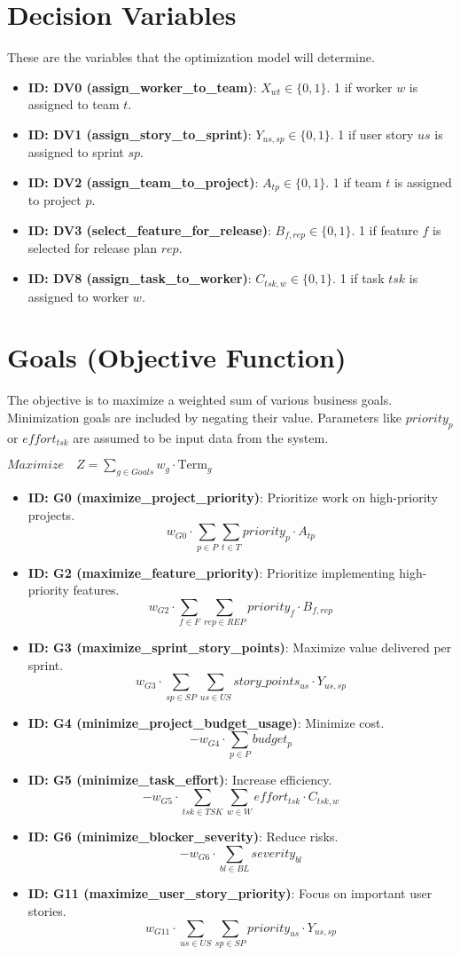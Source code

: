 \documentclass{article}
\begin{document}
\section{Decision Variables}
These are the variables that the optimization model will determine.
\begin{itemize}
    \item \textbf{ID: DV0 (assign\_worker\_to\_team)}: $X_{wt} \in \{0, 1\}$. 1 if worker $w$ is assigned to team $t$.
    \item \textbf{ID: DV1 (assign\_story\_to\_sprint)}: $Y_{us,sp} \in \{0, 1\}$. 1 if user story $us$ is assigned to sprint $sp$.
    \item \textbf{ID: DV2 (assign\_team\_to\_project)}: $A_{tp} \in \{0, 1\}$. 1 if team $t$ is assigned to project $p$.
    \item \textbf{ID: DV3 (select\_feature\_for\_release)}: $B_{f,rep} \in \{0, 1\}$. 1 if feature $f$ is selected for release plan $rep$.
    \item \textbf{ID: DV8 (assign\_task\_to\_worker)}: $C_{tsk,w} \in \{0, 1\}$. 1 if task $tsk$ is assigned to worker $w$.
\end{itemize}

\section{Goals (Objective Function)}
The objective is to maximize a weighted sum of various business goals. Minimization goals are included by negating their value. Parameters like $priority_p$ or $effort_{tsk}$ are assumed to be input data from the system.

$Maximize \quad Z = \sum_{g \in Goals} w_g \cdot \text{Term}_g$

\begin{itemize}
    \item \textbf{ID: G0 (maximize\_project\_priority)}: Prioritize work on high-priority projects.
    $$ w_{G0} \cdot \sum_{p \in P} \sum_{t \in T} priority_p \cdot A_{tp} $$
    \item \textbf{ID: G2 (maximize\_feature\_priority)}: Prioritize implementing high-priority features.
    $$ w_{G2} \cdot \sum_{f \in F} \sum_{rep \in REP} priority_f \cdot B_{f,rep} $$
    \item \textbf{ID: G3 (maximize\_sprint\_story\_points)}: Maximize value delivered per sprint.
    $$ w_{G3} \cdot \sum_{sp \in SP} \sum_{us \in US} story\_points_{us} \cdot Y_{us,sp} $$
    \item \textbf{ID: G4 (minimize\_project\_budget\_usage)}: Minimize cost.
    $$ -w_{G4} \cdot \sum_{p \in P} budget_p $$
    \item \textbf{ID: G5 (minimize\_task\_effort)}: Increase efficiency.
    $$ -w_{G5} \cdot \sum_{tsk \in TSK} \sum_{w \in W} effort_{tsk} \cdot C_{tsk,w} $$
    \item \textbf{ID: G6 (minimize\_blocker\_severity)}: Reduce risks.
    $$ -w_{G6} \cdot \sum_{bl \in BL} severity_{bl} $$
    \item \textbf{ID: G11 (maximize\_user\_story\_priority)}: Focus on important user stories.
    $$ w_{G11} \cdot \sum_{us \in US} \sum_{sp \in SP} priority_{us} \cdot Y_{us,sp} $$
\end{itemize}
\end{document}
